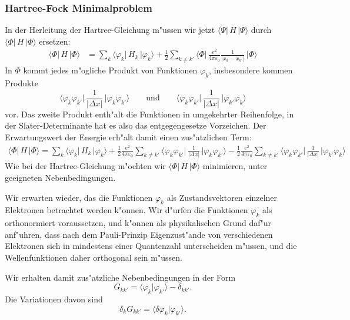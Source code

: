 \subsubsection{Hartree-Fock Minimalproblem}
In der Herleitung der Hartree-Gleichung m"ussen wir jetzt
$\langle\Psi|\,H\,|\Psi\rangle$ 
durch
$\langle\Phi|\,H\,|\Phi\rangle$ 
ersetzen:
\begin{align*}
\langle\Phi|\,H\,|\Phi\rangle
&=
\sum_k\langle\varphi_k|\,H_k\,|\varphi_k\rangle
+
\frac12
\sum_{k\ne k'}\biggl\langle\Phi\biggl|\,
\frac{e^2}{4\pi\varepsilon_0}
\frac{1}{|x_k-x_{k'}|}
\,\biggr|\Phi\biggr\rangle
\end{align*}
In $\Phi$ kommt jedes m"ogliche Produkt von Funktionen $\varphi_k$,
insbesondere kommen Produkte
\[
\biggl\langle\varphi_k\varphi_{k'}\biggr|\,
\frac{1}{|\Delta x|}
\,\biggl|\varphi_k\varphi_{k'}\biggr\rangle
\qquad\text{und}\qquad
\biggl\langle\varphi_k\varphi_{k'}\biggr|\,
\frac{1}{|\Delta x|}
\,\biggl|\varphi_{k'}\varphi_k\biggr\rangle
\]
vor.
Das zweite Produkt enth"alt die Funktionen in umgekehrter Reihenfolge,
in der Slater-Deter\-minante hat es also das entgegengesetze Vorzeichen.
Der Erwartungswert der Energie erh"alt damit einen zus"atzlichen Term:
\begin{align*}
\langle\Phi|\,H\,|\Phi\rangle
=
\sum_k\langle\varphi_k|\,H_k\,|\varphi_k\rangle
+
\frac12
\frac{e^2}{4\pi\varepsilon_0}
\sum_{k\ne k'}
\biggl\langle\varphi_k\varphi_{k'}\biggr|\,
\frac{1}{|\Delta x|}
\,\biggl|\varphi_k\varphi_{k'}\biggr\rangle
-
\frac12
\frac{e^2}{4\pi\varepsilon_0}
\sum_{k\ne k'}
\biggl\langle\varphi_k\varphi_{k'}\biggr|\,
\frac{1}{|\Delta x|}
\,\biggl|\varphi_{k'}\varphi_k\biggr\rangle
\end{align*}
Wie bei der Hartree-Gleichung m"ochten wir
$\langle\Phi|\,H\,|\Phi\rangle$ 
minimieren, unter geeigneten Nebenbedingungen.

Wir erwarten wieder, das die Funktionen $\varphi_k$ als Zustandsvektoren
einzelner Elektronen betrachtet werden k"onnen.
Wir d"urfen die Funktionen $\varphi_k$ als orthonormiert voraussetzen,
und k"onnen als physikalischen Grund daf"ur anf"uhren, dass
nach dem Pauli-Prinzip Eigenzust"ande
von verschiedenen Elektronen sich in mindestens einer Quantenzahl
unterscheiden m"ussen, und die Wellenfunktionen daher orthogonal
sein m"ussen.

Wir erhalten damit zus"atzliche Nebenbedingungen in der Form
\[
G_{kk'}=\langle\varphi_k|\varphi_{k'}\rangle-\delta_{kk'}.
\]
Die Variationen davon sind
\[
\delta_k G_{kk'}
=
\langle\delta\varphi_k |\varphi_{k'}\rangle.
\]

